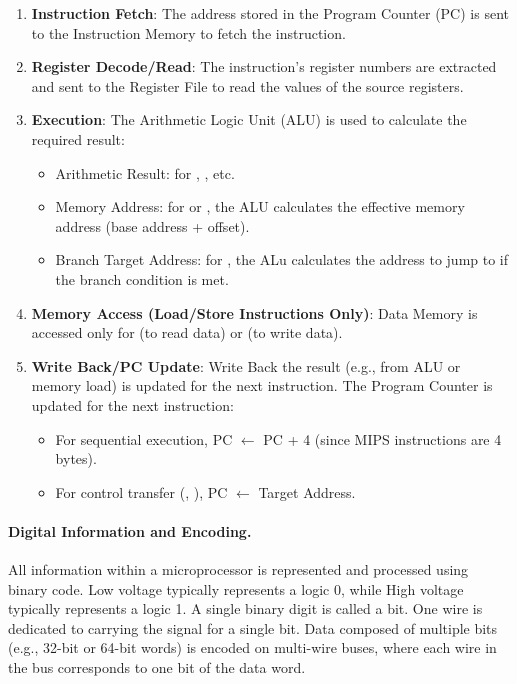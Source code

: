 \begin{enumerate}
    \item \textbf{Instruction Fetch}: The address stored in the Program Counter (PC) is sent to the Instruction Memory to fetch the instruction.

    \item \textbf{Register Decode/Read}: The instruction's register numbers are extracted and sent to the Register File to read the values of the source registers.

    \item \textbf{Execution}: The Arithmetic Logic Unit (ALU) is used to calculate the required result:
          \begin{itemize}
              \item Arithmetic Result: for , , etc.
              \item Memory Address: for  or , the ALU calculates the
                    effective memory address (base address + offset).
              \item Branch Target Address: for , the ALu calculates the address to
                    jump to if the branch condition is met.
          \end{itemize}

    \item \textbf{Memory Access (Load/Store Instructions Only)}: Data Memory is accessed only for  (to read data) or  (to write data).

    \item \textbf{Write Back/PC Update}: Write Back the result (e.g., from ALU or memory load) is updated for the next instruction. The Program Counter is updated for the next instruction:
          \begin{itemize}
              \item For sequential execution, PC \(\leftarrow\) PC + 4 (since MIPS instructions are
                    4 bytes).
              \item For control transfer (, ), PC \(\leftarrow\) Target
                    Address.
          \end{itemize}
\end{enumerate}

\paragraph{Digital Information and Encoding.} All information within a microprocessor is represented and processed using
binary code. Low voltage typically represents a logic 0, while High voltage
typically represents a logic 1. A single binary digit is called a bit. One wire
is dedicated to carrying the signal for a single bit. Data composed of multiple
bits (e.g., 32-bit or 64-bit words) is encoded on multi-wire buses, where each
wire in the bus corresponds to one bit of the data word.

